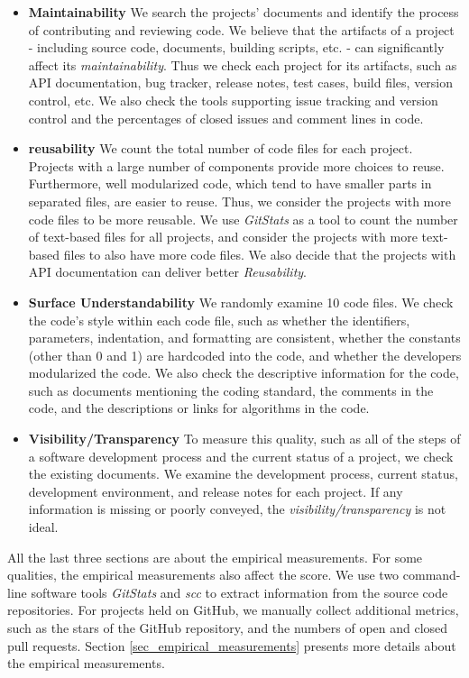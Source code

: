 \begin{itemize}
\item \textbf{Maintainability} We search the projects' documents and identify the process of contributing and reviewing code. We believe that the artifacts of a project - including source code, documents, building scripts, etc. - can significantly affect its  \textit{maintainability}. Thus we check each project for its artifacts, such as API documentation, bug tracker, release notes, test cases, build files, version control, etc. We also check the tools supporting issue tracking and version control and the percentages of closed issues and comment lines in code.

\item \textbf{reusability} We count the total number of code files for each project. Projects with a large number of components provide more choices to reuse. Furthermore, well modularized code, which tend to have smaller parts in separated files, are easier to reuse. Thus, we consider the projects with more code files to be more reusable. We use \textit{GitStats} as a tool to count the number of text-based files for all projects, and consider the projects with more text-based files to also have more code files. We also decide that the projects with API documentation can deliver better \textit{Reusability}.

\item \textbf{Surface Understandability} We randomly examine 10 code files. We check the code’s style within each code file, such as whether the identifiers, parameters, indentation, and formatting are consistent, whether the constants (other than 0 and 1) are hardcoded into the code, and whether the developers modularized the code. We also check the descriptive information for the code, such as documents mentioning the coding standard, the comments in the code, and the descriptions or links for algorithms in the code. 

\item \textbf{Visibility/Transparency} To measure this quality, such as all of the steps of a software development process and the current status of a project, we check the existing documents. We examine the development process, current status, development environment, and release notes for each project. If any information is missing or poorly conveyed, the \textit{visibility/transparency} is not ideal.
\end{itemize}

All the last three sections are about the empirical measurements. For some qualities, the empirical measurements also affect the score. We use two command-line software tools \textit{GitStats} and \textit{scc} to extract information from the source code repositories. For projects held on GitHub, we manually collect additional metrics, such as the stars of the GitHub repository, and the numbers of open and closed pull requests. Section \ref{sec_empirical_measurements} presents more details about the empirical measurements.

